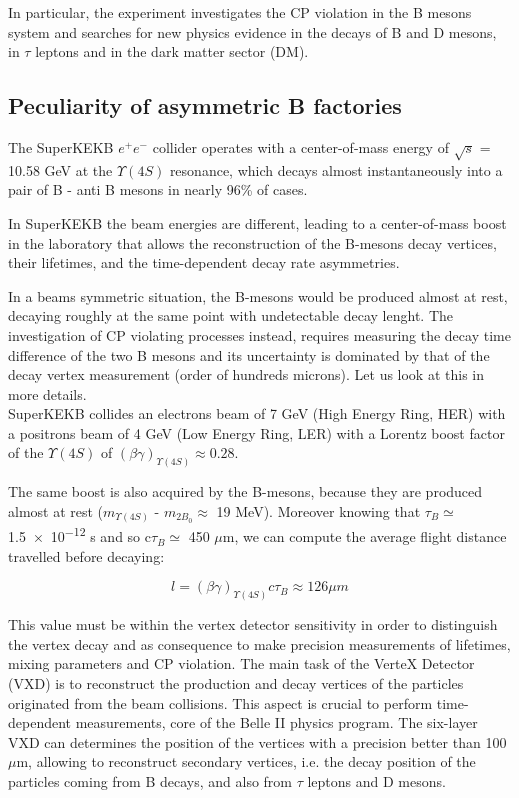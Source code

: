 In particular, the experiment investigates the CP violation in the B mesons system and searches for new physics evidence in the decays of B and D mesons, in $\tau$ leptons and in the dark matter sector (DM).


\subsection{Peculiarity of asymmetric B factories} \label{sec:vertex_decay}

The SuperKEKB $e^{+}e^{-}$ collider operates with a center-of-mass energy of $\sqrt{s}$ = 10.58 GeV at the $\Upsilon(4S)$ resonance, which decays almost instantaneously into a pair of B - anti B mesons in nearly 96\% of cases. 

In SuperKEKB the beam energies are different, leading to a center-of-mass boost in the laboratory that allows the reconstruction of the B-mesons decay vertices, their lifetimes, and the time-dependent decay rate asymmetries.

In a beams symmetric situation, the B-mesons would be produced almost at rest, decaying roughly at the same point with undetectable decay lenght. 
The investigation of CP violating processes instead, requires measuring the decay time difference of the two B mesons and its uncertainty is dominated by that of the decay vertex measurement (order of hundreds microns). Let us look at this in more details.\\

SuperKEKB collides an electrons beam of 7 GeV (High Energy Ring, HER) with a positrons beam of 4 GeV (Low Energy Ring, LER) with a Lorentz boost factor of the $\Upsilon(4S)$ of $(\beta\gamma)_{\Upsilon(4S)} \approx 0.28 $.

The same boost is also acquired by the B-mesons, because they are produced almost at rest ($m_{\Upsilon(4S)}$ - $m_{2B_{0}}\approx$ 19 MeV). Moreover knowing that $\tau_{B}\simeq $\num{1.5e-12} s and so c$\tau_{B}\simeq$ 450 $\mu$m, we can compute the average flight distance travelled before decaying:

\begin{equation}
\textit{l} = (\beta\gamma)_{\Upsilon(4S)}c\tau_{B} \approx 126 \mu m  
\end{equation} 

This value must be within the vertex detector sensitivity in order to distinguish the vertex decay and as consequence to make precision measurements of lifetimes, mixing parameters and CP violation. 
The main task of the VerteX Detector (VXD) is to reconstruct the production and decay vertices of the particles originated from the beam collisions. This aspect is crucial to perform time-dependent measurements, core of the Belle II physics program. The six-layer VXD can determines the position of the vertices with a precision better than 100 $\mu$m, allowing to reconstruct secondary vertices, i.e. the decay position of the particles coming from B decays, and also from $\tau$ leptons and D mesons.

